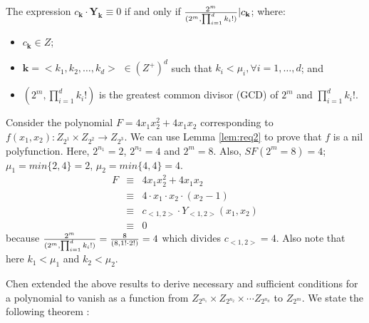 \begin{Lemma}\label{lem:req2}
The expression $c_\textbf{k}\cdot \textbf{Y}_\textbf{k} \equiv 0$ if
and only if $ {{2^m} \over {
    (2^m,\prod_{i=1}^{d}k_i!)}}|c_\textbf{k}$; where:
\begin{itemize}
\item $c_\textbf{k}\in Z$;
\item $\textbf{k} = <k_1, k_2, \ldots, k_d>$ $\in (Z^+)^d$ such that 
$k_i < \mu_i, \forall i=1, \ldots, d$; and
\item ${(2^m,\prod_{i=1}^{d}k_i!)}$ is the greatest common divisor (GCD)
  of $2^m$ and $\prod_{i=1}^{d}k_i!$.
\end{itemize}

\end{Lemma}

\begin{Example}\label{ex:req2}
Consider the polynomial $F =  4x_1 x_2^2 + 4x_1 x_2$ corresponding to $f(x_1,
x_2): Z_{2^1} \times Z_{2^2} \rightarrow Z_{2^3}$. We can use Lemma
\ref{lem:req2} to prove that $f$ is a nil polyfunction.  Here,
$2^{n_1}=2$, $2^{n_2} = 4$ and $2^m = 8$. 
Also, $SF(2^m = 8) = 4$; $\mu_1 = min\{2, 4\} = 2$, $\mu_2 = min\{4,
4\} = 4$. 
\vspace{-0.1in}
\begin{eqnarray}
F &\equiv& 4x_1 x_2^2 + 4x_1 x_2 \nonumber \\
  &\equiv& 4 \cdot x_1\cdot x_2\cdot(x_2-1)\nonumber\\
  &\equiv& c_{<1, 2>} \cdot Y_{<1,2>}(x_1, x_2)\nonumber\\
  &\equiv& 0 \nonumber
\end{eqnarray}
because ${{2^m} \over {(2^m,\prod_{i=1}^{d}k_i!)}} =
{{8}\over{(8,1!\cdot 2!)}} = 4 $ which divides $c_{<1, 2>} = 4$.  Also
note that here $k_1 < \mu_1$ and $k_2 < \mu_2$.
\end{Example}


Chen extended the above results to derive necessary and sufficient 
conditions for a polynomial to vanish as a function from 
$Z_{2^{n_1}} \times Z_{2^{n_2}} \times \cdots Z_{2^{n_d}}$ to
$Z_{2^m}$. We state the following theorem \cite{chen_96}: 

